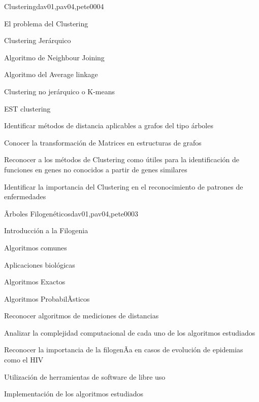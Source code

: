 \begin{syllabus}
\begin{unit}{Clustering}{dav01,pav04,pete00}{0}{4}
\begin{topics}
        \item El problema del Clustering
        \item Clustering Jerárquico
        \item Algoritmo de Neighbour Joining
        \item Algoritmo del Average linkage
        \item Clustering no jerárquico o K-means
        \item EST clustering
    \end{topics}
    \begin{unitgoals}
        \item Identificar métodos de distancia aplicables a grafos del tipo árboles
        \item Conocer la transformación de Matrices en estructuras de grafos
        \item Reconocer a los métodos de Clustering como útiles para la identificación de funciones en genes no conocidos a partir de genes similares
        \item Identificar la importancia del Clustering en el reconocimiento de patrones de enfermedades
    \end{unitgoals}
\end{unit}

\begin{unit}{Ãrboles Filogenéticos}{dav01,pav04,pete00}{0}{3}
\begin{topics}
        \item Introducción a la Filogenia
        \item Algoritmos comunes
        \item Aplicaciones biológicas
        \item Algoritmos Exactos
        \item Algoritmos ProbabilÃ­sticos
    \end{topics}
    \begin{unitgoals}
        \item Reconocer algoritmos de mediciones de distancias
        \item Analizar la complejidad computacional de cada uno de los algoritmos estudiados
        \item Reconocer la importancia de la filogenÃ­a en casos de evolución de epidemias como el HIV
        \item Utilización de herramientas de software de libre uso
        \item Implementación de los algoritmos estudiados
    \end{unitgoals}
\end{unit}


\end{syllabus}
